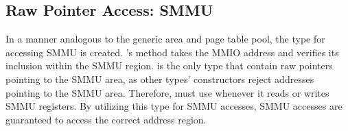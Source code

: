 \subsection{Raw Pointer Access: SMMU}
In a manner analogous to the generic area and page table pool, the type
 for accessing SMMU is created.
's  method takes the MMIO address and
verifies its inclusion within the SMMU region.
 is the only type that contain raw pointers pointing to the
SMMU area, as other types' constructors reject addresses pointing to the SMMU
area. Therefore, \rustcore{} must use  whenever it reads or
writes SMMU registers. By utilizing this type for SMMU accesses, SMMU accesses
are guaranteed to access the correct address region.
